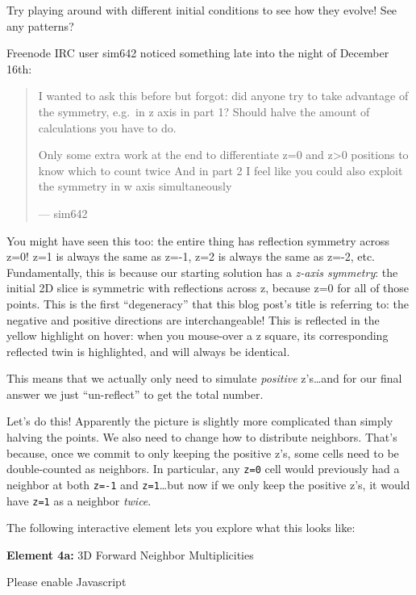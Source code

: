 \documentclass[]{article}
\begin{document}
Try playing around with different initial conditions to see how they evolve! See
any patterns?

Freenode IRC user sim642 noticed something late into the night of December 16th:

\begin{quote}
I wanted to ask this before but forgot: did anyone try to take advantage of the
symmetry, e.g.~in z axis in part 1? Should halve the amount of calculations you
have to do.

Only some extra work at the end to differentiate z=0 and z\textgreater0
positions to know which to count twice And in part 2 I feel like you could also
exploit the symmetry in w axis simultaneously

--- sim642
\end{quote}

You might have seen this too: the entire thing has reflection symmetry across
z=0! z=1 is always the same as z=-1, z=2 is always the same as z=-2, etc.
Fundamentally, this is because our starting solution has a \emph{z-axis
symmetry}: the initial 2D slice is symmetric with reflections across z, because
z=0 for all of those points. This is the first ``degeneracy'' that this blog
post's title is referring to: the negative and positive directions are
interchangeable! This is reflected in the yellow highlight on hover: when you
mouse-over a z square, its corresponding reflected twin is highlighted, and will
always be identical.

This means that we actually only need to simulate \emph{positive} z's\ldots and
for our final answer we just ``un-reflect'' to get the total number.

Let's do this! Apparently the picture is slightly more complicated than simply
halving the points. We also need to change how to distribute neighbors. That's
because, once we commit to only keeping the positive z's, some cells need to be
double-counted as neighbors. In particular, any \texttt{z=0} cell would
previously had a neighbor at both \texttt{z=-1} and \texttt{z=1}\ldots but now
if we only keep the positive z's, it would have \texttt{z=1} as a neighbor
\emph{twice}.

The following interactive element lets you explore what this looks like:

\leavevmode\hypertarget{golSyms3DForward}{}%
\textbf{Element 4a:} 3D Forward Neighbor Multiplicities

\leavevmode\hypertarget{golSyms3DForwardCont}{}%
Please enable Javascript
\end{document}
